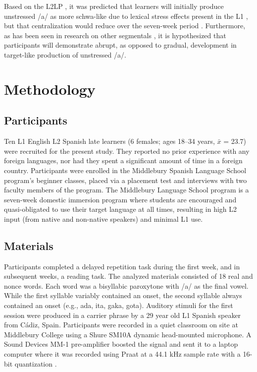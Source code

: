 \documentclass[
  a4paper,
  11pt,
  twocolumn]{article}
\begin{document}
Based on the L2LP
\cite{escudero2004bridging,escudero2005linguistic,escudero2007second,escudero2009linguistic,van2015learning},
it was predicted that learners will initially produce unstressed /a/ as
more schwa-like due to lexical stress effects present in the L1
\cite{bybee2003phonology,cobb2009pronunciacion,cobb2015adult}, but that
centralization would reduce over the seven-week period
\cite{casillas2016longitudinal}. Furthermore, as has been seen in
research on other segmentals \cite{casillas2020phonetic}, it is
hypothesized that participants will demonstrate abrupt, as opposed to
gradual, development in target-like production of unstressed /a/.

\section{Methodology}

\subsection{Participants}

Ten L1 English L2 Spanish late learners (6 females; ages 18--34 years,
\(\bar{x}\) = 23.7) were recruited for the present study. They reported
no prior experience with any foreign languages, nor had they spent a
significant amount of time in a foreign country. Participants were
enrolled in the Middlebury Spanish Language School program's beginner
classes, placed via a placement test and interviews with two faculty
members of the program. The Middlebury Language School program is a
seven-week domestic immersion program where students are encouraged and
quasi-obligated to use their target language at all times, resulting in
high L2 input (from native and non-native speakers) and minimal L1 use.

\subsection{Materials}

Participants completed a delayed repetition task during the first week,
and in subsequent weeks, a reading task. The analyzed materials
consisted of 18 real and nonce words. Each word was a bisyllabic
paroxytone with /a/ as the final vowel. While the first syllable
variably contained an onset, the second syllable always contained an
onset (e.g., ada, ita, gaka, gota). Auditory stimuli for the first
session were produced in a carrier phrase by a 29 year old L1 Spanish
speaker from Cádiz, Spain. Participants were recorded in a quiet
classroom on site at Middlebury College using a Shure SM10A dynamic
head-mounted microphone. A Sound Devices MM-1 pre-amplifier boosted the
signal and sent it to a laptop computer where it was recorded using
Praat at a 44.1 kHz sample rate with a 16-bit quantization
\cite{boersma2025praat}.
\end{document}
